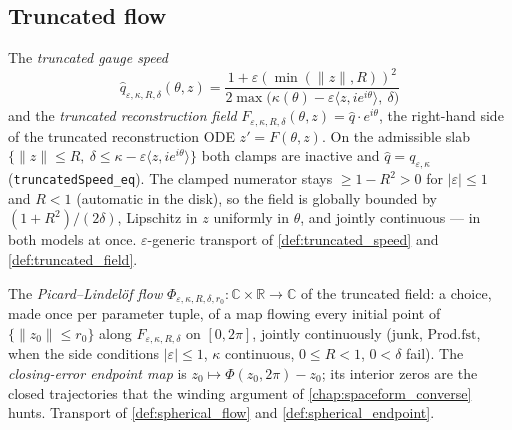 \subsection{Truncated flow}

\begin{definition}
  \label{def:spaceform_truncated_field}
  The \emph{truncated gauge speed}
  \[
    \hat q_{\varepsilon,\kappa,R,\delta}(\theta,z)=
    \frac{1+\varepsilon(\min(\|z\|,R))^2}
         {2\max\bigl(\kappa(\theta)-\varepsilon\langle z,
           ie^{i\theta}\rangle,\ \delta\bigr)}
  \]
  and the \emph{truncated reconstruction field}
  $F_{\varepsilon,\kappa,R,\delta}(\theta,z)=\hat q\cdot e^{i\theta}$, the
  right-hand side of the truncated reconstruction ODE $z'=F(\theta,z)$. On
  the admissible slab $\{\|z\|\le R,\ \delta\le\kappa-\varepsilon\langle z,
  ie^{i\theta}\rangle\}$ both clamps are inactive and
  $\hat q=q_{\varepsilon,\kappa}$ (\texttt{truncatedSpeed\_eq}). The clamped
  numerator stays $\ge1-R^2>0$ for $|\varepsilon|\le1$ and $R<1$ (automatic
  in the disk), so the field is globally bounded by $(1+R^2)/(2\delta)$,
  Lipschitz in $z$ uniformly in $\theta$, and jointly continuous — in both
  models at once. $\varepsilon$-generic transport of
  \cref{def:truncated_speed} and \cref{def:truncated_field}.
\end{definition}

\begin{definition}
  \label{def:spaceform_flow}
  The \emph{Picard--Lindel\"of flow}
  $\Phi_{\varepsilon,\kappa,R,\delta,r_0}:\mathbb C\times\mathbb R\to\mathbb
  C$ of the truncated field: a choice, made once per parameter tuple, of a
  map flowing every initial point of $\{\|z_0\|\le r_0\}$ along
  $F_{\varepsilon,\kappa,R,\delta}$ on $[0,2\pi]$, jointly continuously
  (junk, $\mathrm{Prod.fst}$, when the side conditions $|\varepsilon|\le1$,
  $\kappa$ continuous, $0\le R<1$, $0<\delta$ fail). The \emph{closing-error
  endpoint map} is $z_0\mapsto\Phi(z_0,2\pi)-z_0$; its interior zeros are the
  closed trajectories that the winding argument of
  \cref{chap:spaceform_converse} hunts. Transport of
  \cref{def:spherical_flow} and \cref{def:spherical_endpoint}.
\end{definition}

